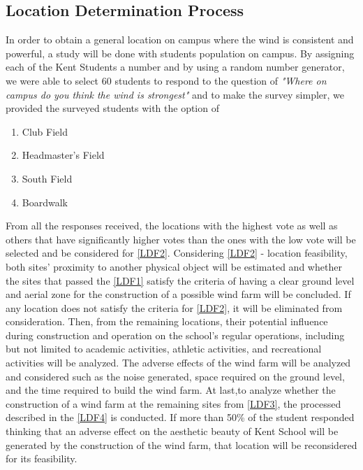 \documentclass[review]{elsarticle}
\begin{document}
\subsection{Location Determination Process}
\label{sec:methods:locdeterprocess} 
In order to obtain a general location on campus where the wind is consistent and powerful, a study will be done with students population on 
campus. By assigning each of the Kent Students a number and by using a random number generator, we were able to select 60 students 
to respond to the question of \textit{"Where on campus do you think the wind is strongest"} and to make the survey simpler, we provided the 
surveyed students with the option of
\begin{enumerate}
    \item {Club Field}
    \item {Headmaster's Field}
    \item {South Field}
    \item {Boardwalk}
\end{enumerate} 
From all the responses received, the locations with the highest vote as well as others that have significantly higher votes than the ones 
with the low vote will be selected and be considered for \ref{LDF2}. Considering \ref{LDF2} - 
location feasibility, both sites' proximity to another physical object will be estimated and whether the sites that passed the \ref{LDF1} 
satisfy the criteria of having a clear ground level and aerial zone for the construction of a possible wind farm will 
be concluded. If any location does not satisfy the criteria for \ref{LDF2}, it will be eliminated from consideration. Then, 
from the remaining locations, their potential influence during construction and operation on the school's regular operations, including 
but not limited to academic activities, athletic activities, and recreational activities will be analyzed. The adverse effects of the wind 
farm will be analyzed and considered such as the noise generated, space required on the ground level, and the time required to build the wind 
farm. At last,to analyze whether the construction of a wind farm at the remaining sites from \ref{LDF3}, the processed 
described in the \ref{LDF4} is conducted. If more than 50\% of the student responded thinking that an adverse effect 
on the aesthetic beauty of Kent School will be generated by the construction of the wind farm, that location will be reconsidered for its feasibility.
\end{document}
